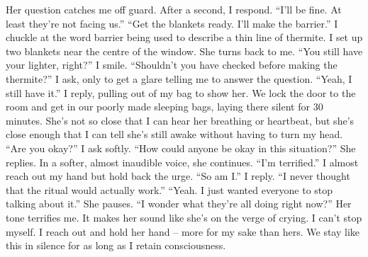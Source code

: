 \documentclass[a4paper, 12pt]{book}
\newcommand\tab[1][1cm]{\hspace*{#1}}
\begin{document}
\newline
\tab
Her question catches me off guard. After a second, I respond. “I’ll be fine. At least they’re not facing us.”
\newline
\tab
“Get the blankets ready. I’ll make the barrier.” I chuckle at the word barrier being used to describe a thin line of thermite. I set up two blankets near the centre of the window. She turns back to me. “You still have your lighter, right?”
\newline
\tab
I smile. “Shouldn’t you have checked before making the thermite?” I ask, only to get a glare telling me to answer the question. “Yeah, I still have it.” I reply, pulling out of my bag to show her.
\newline
\tab
We lock the door to the room and get in our poorly made sleeping bags, laying there silent for 30 minutes. She’s not so close that I can hear her breathing or heartbeat, but she’s close enough that I can tell she’s still awake without having to turn my head. “Are you okay?” I ask softly.
\newline
\tab
“How could anyone be okay in this situation?” She replies. In a softer, almost inaudible voice, she continues. “I’m terrified.”
\newline
\tab
I almost reach out my hand but hold back the urge. “So am I.” I reply. “I never thought that the ritual would actually work.”
\newline
\tab
“Yeah. I just wanted everyone to stop talking about it.” She pauses. “I wonder what they’re all doing right now?” Her tone terrifies me. It makes her sound like she’s on the verge of crying. I can’t stop myself. I reach out and hold her hand – more for my sake than hers. We stay like this in silence for as long as I retain consciousness.
\end{document}
